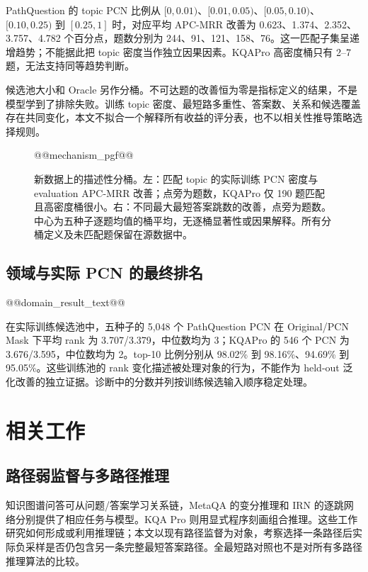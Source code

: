 \documentclass[UTF8,a4paper,10pt,fontset=fandol]{ctexart}
\begin{document}
PathQuestion 的 topic PCN 比例从 $[0,0.01)$、$[0.01,0.05)$、$[0.05,0.10)$、$[0.10,0.25)$ 到 $[0.25,1]$ 时，对应平均 APC-MRR 改善为 0.623、1.374、2.352、3.757、4.782 个百分点，题数分别为 244、91、121、158、76。这一匹配子集呈递增趋势；不能据此把 topic 密度当作独立因果因素。KQAPro 高密度桶只有 2--7 题，无法支持同等趋势判断。

候选池大小和 Oracle 另作分桶。不可达题的改善恒为零是指标定义的结果，不是模型学到了排除失败。训练 topic 密度、最短路多重性、答案数、关系和候选覆盖存在共同变化，本文不拟合一个解释所有收益的评分表，也不以相关性推导策略选择规则。

\begin{figure}[tbp]\centering
\begin{lrbox}{\pcnfigurebox}
@@mechanism_pgf@@
\end{lrbox}\resizebox{\linewidth}{!}{\usebox{\pcnfigurebox}}
\caption{新数据上的描述性分桶。左：匹配 topic 的实际训练 PCN 密度与 evaluation APC-MRR 改善；点旁为题数，KQAPro 仅 190 题匹配且高密度桶很小。右：不同最大最短答案跳数的改善，点旁为题数。中心为五种子逐题均值的桶平均，无逐桶显著性或因果解释。所有分桶定义及未匹配题保留在源数据中。}\label{fig:mechanism}
\end{figure}

\subsection{领域与实际 PCN 的最终排名}
@@domain_result_text@@

在实际训练候选池中，五种子的 5,048 个 PathQuestion PCN 在 Original/PCN Mask 下平均 rank 为 3.707/3.379，中位数均为 3；KQAPro 的 546 个 PCN 为 3.676/3.595，中位数均为 2。top-10 比例分别从 98.02\% 到 98.16\%、94.69\% 到 95.05\%。这些训练池的 rank 变化描述被处理对象的行为，不能作为 held-out 泛化改善的独立证据。诊断中的分数并列按训练候选输入顺序稳定处理。

\section{相关工作}
\subsection{路径弱监督与多路径推理}
知识图谱问答可从问题/答案学习关系链，MetaQA 的变分推理和 IRN 的逐跳网络分别提供了相应任务与模型\cite{metaqa,pq}。KQA Pro 则用显式程序刻画组合推理\cite{kqa}。这些工作研究如何形成或利用推理链；本文以现有路径监督为对象，考察选择一条路径后实际负采样是否仍包含另一条完整最短答案路径。全最短路对照也不是对所有多路径推理算法的比较。
\end{document}
